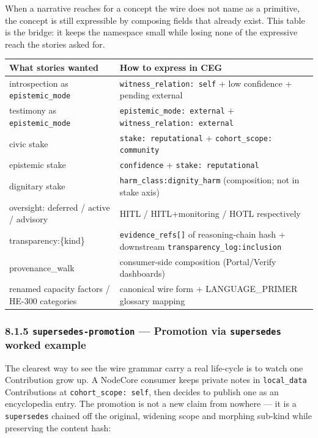 \documentclass[11pt]{article}
\begin{document}
When a narrative reaches for a concept the wire does not name as a primitive, the concept is still expressible by composing fields that already exist. This table is the bridge: it keeps the namespace small while losing none of the expressive reach the stories asked for.


{\footnotesize
\begin{longtable}{|p{8.0cm}|p{8.0cm}|}\hline
\textbf{What stories wanted} & \textbf{How to express in CEG} \\ \hline\endhead
introspection as \texttt{epistemic\_mode} & \texttt{witness\_relation: self} + low confidence + pending external \\ \hline
testimony as \texttt{epistemic\_mode} & \texttt{epistemic\_mode: external} + \texttt{witness\_relation: external} \\ \hline
civic stake & \texttt{stake: reputational} + \texttt{cohort\_scope: community} \\ \hline
epistemic stake & \texttt{confidence} + \texttt{stake: reputational} \\ \hline
dignitary stake & \texttt{harm\_class:dignity\_harm} (composition; not in stake axis) \\ \hline
oversight: deferred / active / advisory & HITL / HITL+monitoring / HOTL respectively \\ \hline
transparency:\{kind\} & \texttt{evidence\_refs[]} of reasoning-chain hash + downstream \texttt{transparency\_log:inclusion} \\ \hline
provenance\_walk & consumer-side composition (Portal/Verify dashboards) \\ \hline
renamed capacity factors / HE-300 categories & canonical wire form + LANGUAGE\_PRIMER glossary mapping \\ \hline
\end{longtable}}


\subsubsection*{8.1.5 \texttt{supersedes-promotion} — Promotion via \texttt{supersedes} worked example}


The clearest way to see the wire grammar carry a real life-cycle is to watch one Contribution grow up. A NodeCore consumer keeps private notes in \texttt{local\_data} Contributions at \texttt{cohort\_scope: self}, then decides to publish one as an encyclopedia entry. The promotion is not a new claim from nowhere — it is a \texttt{supersedes} chained off the original, widening scope and morphing sub-kind while preserving the content hash:
\end{document}
